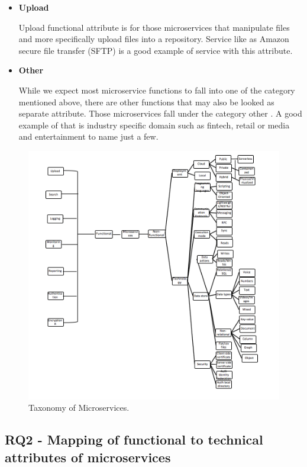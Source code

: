 \documentclass{article}
\begin{document}
\begin{itemize}
\item \textbf{Upload}

Upload functional attribute is for those microservices that manipulate files and more specifically upload files into a repository. Service like as Amazon secure file transfer (SFTP) is a good example of service with this attribute.

\item \textbf{Other}

While we expect most microservice functions to fall into one of the category mentioned above, there are other functions that may also be looked as separate attribute. Those microservices fall under the category other . A good example of that is industry specific domain such as fintech, retail or media and entertainment to name just a few.

\end{itemize}

\begin{figure}[h!]
\includegraphics{taxonomydiagram.png}
\caption{Taxonomy of Microservices.}
\end{figure}

\subsection{RQ2 - Mapping of functional to technical attributes of microservices}
\end{document}
